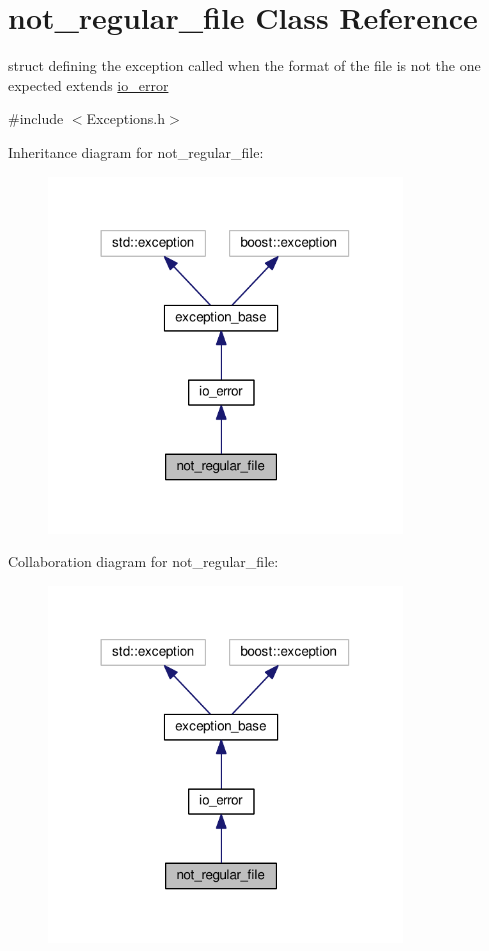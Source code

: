 \hypertarget{structnot__regular__file}{\section{not\+\_\+regular\+\_\+file Class Reference}
\label{structnot__regular__file}
}


struct defining the exception called when the format of the file is not the one expected extends \hyperlink{structio__error}{io\+\_\+error}  




{\ttfamily \#include $<$Exceptions.\+h$>$}



Inheritance diagram for not\+\_\+regular\+\_\+file\+:\nopagebreak
\begin{figure}[H]
\begin{center}
\leavevmode
\includegraphics[width=266pt]{structnot__regular__file__inherit__graph}
\end{center}
\end{figure}


Collaboration diagram for not\+\_\+regular\+\_\+file\+:\nopagebreak
\begin{figure}[H]
\begin{center}
\leavevmode
\includegraphics[width=266pt]{structnot__regular__file__coll__graph}
\end{center}
\end{figure}


